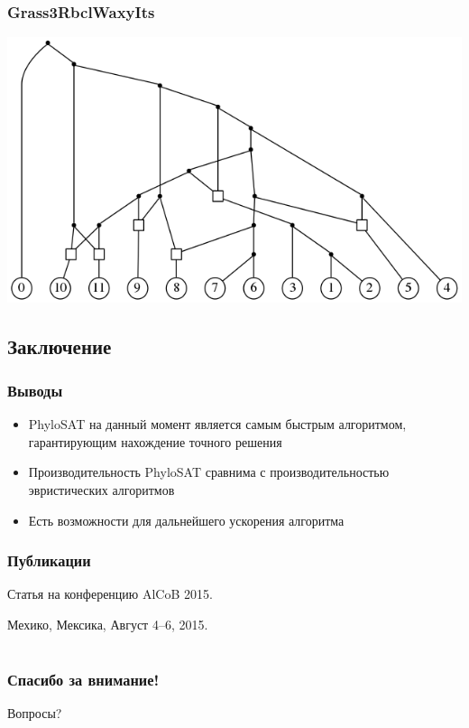 \documentclass[hyperref={unicode}]{beamer}
\begin{document}
\begin{frame}
\frametitle{Grass3RbclWaxyIts}

\includegraphics[width=\linewidth]{img/Grass3RbclWaxyIts}
	
\end{frame}

\subsection{Заключение}

\begin{frame}
\frametitle{Выводы}

\begin{itemize}
	\item PhyloSAT на данный момент является самым быстрым алгоритмом, гарантирующим нахождение точного решения
	\item Производительность PhyloSAT сравнима с производительностью эвристических алгоритмов
	\item Есть возможности для дальнейшего ускорения алгоритма
\end{itemize}

\end{frame}

\begin{frame}
\frametitle{Публикации}

Статья на конференцию AlCoB 2015.

Мехико, Мексика, Август 4--6, 2015.

\end{frame}

\section{}

\begin{frame}
\frametitle{Спасибо за внимание!}

Вопросы?
\end{frame}
\end{document}
